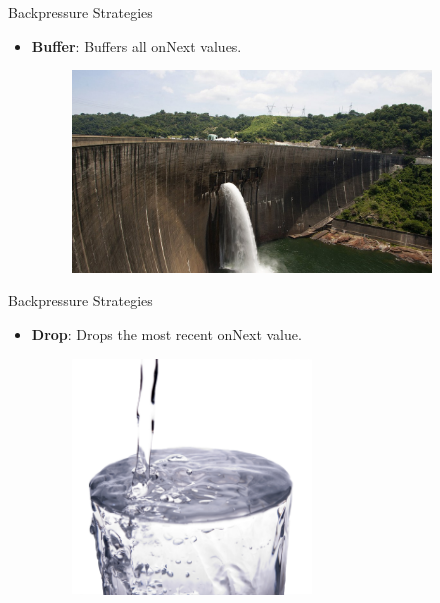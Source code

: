 \begin{frame}{Backpressure Strategies}
	\begin{itemize}
    	\item \textbf{Buffer}: Buffers all onNext values. %
        \begin{figure}[h]
			\includegraphics[width=0.9\textwidth,page=1]{gfx/dam.jpg}
		\end{figure}
	\end{itemize}
\end{frame}

\begin{frame}{Backpressure Strategies}
	\begin{itemize}
    	\item \textbf{Drop}: Drops the most recent onNext value. %
        \begin{figure}[h]
			\includegraphics[width=0.6\textwidth,page=1]{gfx/Overflow.jpg}
		\end{figure}
	\end{itemize}
\end{frame}

